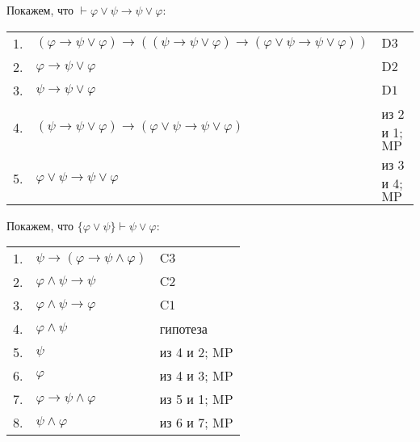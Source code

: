 \documentclass[12pt,a4paper]{article}
\begin{document}
    \begin{example}
        Покажем, что $\vdash \varphi \vee \psi \rightarrow \psi \vee \varphi$:
        \begin{center}
            \begin{tabular}{rll}
                1.& $(\varphi \rightarrow \psi \vee \varphi) \rightarrow ((\psi \rightarrow \psi \vee \varphi) \rightarrow (\varphi \vee \psi \rightarrow \psi \vee \varphi))$& $\mathrm{D3}$\\
                2.& $\varphi \rightarrow \psi \vee \varphi$& $\mathrm{D2}$\\
                3.& $\psi \rightarrow \psi \vee \varphi$& $\mathrm{D1}$\\
                4.& $(\psi \rightarrow \psi \vee \varphi) \rightarrow (\varphi \vee \psi \rightarrow \psi \vee \varphi)$& из 2 и 1; $\mathrm{MP}$\\
                5.& $\varphi \vee \psi \rightarrow \psi \vee \varphi$& из 3 и 4; $\mathrm{MP}$\\
            \end{tabular}
        \end{center}
    \end{example}

    \begin{example}
        Покажем, что $\{\varphi \vee \psi\} \vdash \psi \vee \varphi$:
        \begin{center}
            \begin{tabular}{rll}
                1.& $\psi \rightarrow (\varphi \rightarrow \psi \wedge \varphi)$& $\mathrm{C3}$\\
                2.& $\varphi \wedge \psi \rightarrow \psi$& $\mathrm{C2}$\\
                3.& $\varphi \wedge \psi \rightarrow \varphi$& $\mathrm{C1}$\\
                4.& $\varphi \wedge \psi$& гипотеза\\
                5.& $\psi$& из 4 и 2; $\mathrm{MP}$\\
                6.& $\varphi$& из 4 и 3; $\mathrm{MP}$\\
                7.& $\varphi \rightarrow \psi \wedge \varphi$& из 5 и 1; $\mathrm{MP}$\\
                8.& $\psi \wedge \varphi$& из 6 и 7; $\mathrm{MP}$\\
            \end{tabular}
        \end{center}
    \end{example}
\end{document}
